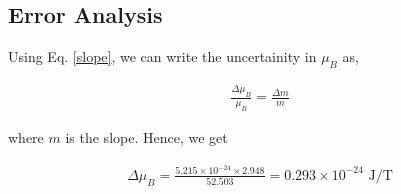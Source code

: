 \subsection*{Error Analysis}
Using Eq. \ref{slope}, we can write the uncertainity in $\mu_B$ as,

\begin{align}
    \frac{\Delta \mu_B}{\mu_B} =  \frac{\Delta m}{m}
\end{align}

where $m$ is the slope. Hence, we get

\begin{align*}
    \Delta \mu_B = \frac{5.215 \times 10^{-24} \times 2.948}{52.503} = 0.293 \times 10^{-24} \text{ J/T}
\end{align*}
